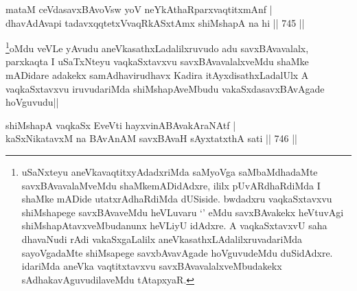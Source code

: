 \begin{shl}
mataM ceVdasavxBAvoV\s sw yoV neYkAthaRparxvaqtitxmAnf | \\
dhavAdAvapi tadavxqqtetxVvaqRkASxtAmx shiMshapA na hi \hfill||  745 ||  
\end{shl}

\begin{artha}
\footnote{uSaNxteyu aneVkavaqtitxyAdadxriMda saMyoVga saMbaMdhadaMte savxBAvavalaMveMdu shaMkemADidAdxre, ililx pUvARdhaRdiMda I shaMke mADide utatxrAdhaRdiMda dUSiside. bwdadxru vaqkaSxtavxvu shiMshapege savxBAvaveMdu heVLuvaru `\stext' eMdu savxBAvakekx heVtuvAgi shiMshapAtavxveMbudanunx heVLiyU idAdxre. A vaqkaSxtavxvU saha dhavaNudi rAdi vakaSxgaLalilx aneVkasathxLAdalilxruvadariMda sayoVgadaMte shiMsapege savxbAvavAgade hoVguvudeMdu duSidAdxre. idariMda aneVka vaqtitxtavxvu savxBAvavalalxveMbudakekx sAdhakavAguvudilaveMdu tAtapxyaR.}oMdu veVLe yAvudu aneVkasathxLadalilxruvudo adu savxBAvavalalx, parxkaqta I uSaTxNteyu vaqkaSxtavxvu savxBAvavalalxveMdu shaMke mADidare adakekx samAdhavirudhavx Kadira itAyxdisathxLadalUlx A vaqkaSxtavxvu iruvudariMda shiMshapAveMbudu vakaSxdasavxBAvAgade hoVguvudu||
\end{artha}


\begin{shl}
shiMshapA vaqkaSx EveVti hayxvinABAvakAraNAtf | \\
kaSxNikatavxM na BAvAnAM savxBAvaH sAyxtatxthA  sati \hfill||  746 || 
\end{shl}

